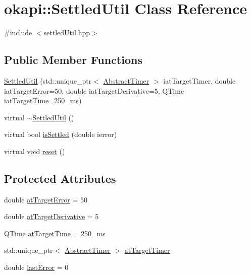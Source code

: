 \hypertarget{classokapi_1_1SettledUtil}{}\section{okapi\+::Settled\+Util Class Reference}
\label{classokapi_1_1SettledUtil}


{\ttfamily \#include $<$settled\+Util.\+hpp$>$}

\subsection*{Public Member Functions}
\begin{DoxyCompactItemize}
\item 
\mbox{\hyperlink{classokapi_1_1SettledUtil_acf531d726b2652977335a713a9853dc6}{Settled\+Util}} (std\+::unique\+\_\+ptr$<$ \mbox{\hyperlink{classokapi_1_1AbstractTimer}{Abstract\+Timer}} $>$ iat\+Target\+Timer, double iat\+Target\+Error=50, double iat\+Target\+Derivative=5, Q\+Time iat\+Target\+Time=250\+\_\+ms)
\item 
virtual \mbox{\hyperlink{classokapi_1_1SettledUtil_abb15aef3ece1e9911b7e26db1c77b2e8}{$\sim$\+Settled\+Util}} ()
\item 
virtual bool \mbox{\hyperlink{classokapi_1_1SettledUtil_aa651d2e0197b73f568993b4cf2520ca5}{is\+Settled}} (double ierror)
\item 
virtual void \mbox{\hyperlink{classokapi_1_1SettledUtil_a5341b7db25eaff4acafbe59b1b385ada}{reset}} ()
\end{DoxyCompactItemize}
\subsection*{Protected Attributes}
\begin{DoxyCompactItemize}
\item 
double \mbox{\hyperlink{classokapi_1_1SettledUtil_ae90caf556f0702edea6c86bd6e9a888f}{at\+Target\+Error}} = 50
\item 
double \mbox{\hyperlink{classokapi_1_1SettledUtil_a972febaf6427ee6ea67d007da2ffbf0a}{at\+Target\+Derivative}} = 5
\item 
Q\+Time \mbox{\hyperlink{classokapi_1_1SettledUtil_a723f415c2860413c22b8467db4a55586}{at\+Target\+Time}} = 250\+\_\+ms
\item 
std\+::unique\+\_\+ptr$<$ \mbox{\hyperlink{classokapi_1_1AbstractTimer}{Abstract\+Timer}} $>$ \mbox{\hyperlink{classokapi_1_1SettledUtil_aebaa16b34b04ee6c7938418f83d47e56}{at\+Target\+Timer}}
\item 
double \mbox{\hyperlink{classokapi_1_1SettledUtil_ac1316106ec5932cc9f6de5cd83d3e155}{last\+Error}} = 0
\end{DoxyCompactItemize}


